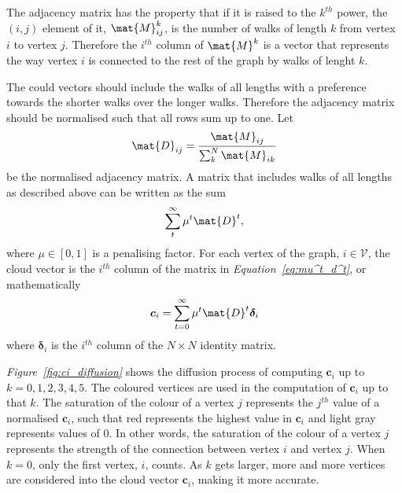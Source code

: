 \documentclass[12pt]{report}
\begin{document}
The adjacency matrix has the property that if it is raised to the $k^{th}$ power,
the $(i, j)$ element of it, $\mat{M}^k_{ij}$, is the number of walks of length
$k$ from vertex $i$ to vertex $j$. Therefore the $i^{th}$ column of $\mat{M}^k$
is a vector that represents the way vertex $i$ is connected to the rest of the
graph by walks of lenght $k$.

The could vectors should include the walks of all lengths with a preference
towards the shorter walks over the longer walks. Therefore the adjacency matrix
should be normalised such that all rows sum up to one. Let
%
\begin{equation}
\label{eq:initial-d}
\mat{D}_{ij} = \frac{\mat{M}_{ij}}{\sum_k^N \mat{M}_{ik}}
\end{equation}
be the normalised adjacency matrix. A matrix that includes walks of all lengths
as described above can be written as the sum
%
\begin{equation}
\label{eq:mu^t_d^t}
\sum_t^\infty \mu^t \mat{D}^t,
\end{equation}
%
where $\mu \in [0,1]$ is a penalising factor. For each vertex of the graph, $i
\in \mathcal{V}$, the cloud vector is the $i^{th}$ column of the matrix in
\emph{Equation~\ref{eq:mu^t_d^t}}, or mathematically
%
\begin{equation}
\label{eq:brute-ci}
\bm{c}_i = \sum_{t=0}^\infty \mu^t \mat{D}^t \bm{\delta}_i
\end{equation}
%
where $\bm{\delta}_i$ is the $i^{th}$ column of the $N \times N$ identity matrix.

\emph{Figure~\ref{fig:ci_diffusion}} shows the diffusion process of computing
$\bm{c}_i$ up to $k = 0, 1, 2, 3, 4, 5$. The coloured vertices are used in the
computation of $\bm{c}_i$ up to that $k$. The saturation of the colour of a vertex
$j$ represents the $j^{th}$ value of a normalised $\bm{c}_i$, such that red
represents the highest value in $\bm{c}_i$ and light gray represents values of 0.
In other words, the saturation of the colour of a vertex $j$ represents the strength
of the connection between vertex $i$ and vertex $j$. When $k=0$, only the first
vertex, $i$, counts. As $k$ gets larger, more and more vertices are considered
into the cloud vector $\bm{c}_i$, making it more accurate.
\end{document}
